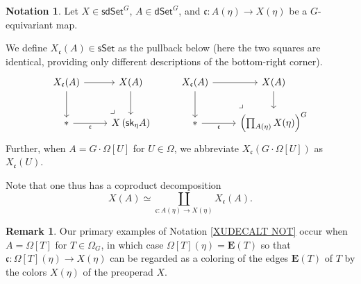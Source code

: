 \documentclass[a4paper,10pt]{article}%
\numberwithin{equation}{section}
\numberwithin{figure}{section}
\theoremstyle{definition} %
\newtheorem{remark}[equation]{Remark}%
\newtheorem{notation}[equation]{Notation}%
\newcommand{\1}{\ensuremath{\mathbbm 1}}%
\begin{document}
\begin{notation}\label{XUDECALT NOT}
	Let $X \in \mathsf{sdSet}^G$, 
	$A \in \mathsf{dSet}^G$,
	and $\mathfrak{c} \colon A(\eta) \to X(\eta)$ 
	be a $G$-equivariant map.
	
	We define $X_{\mathfrak{c}}(A)\in \mathsf{sSet}$
	as the pullback	below
	(here the two squares are identical,
	providing only different descriptions of the bottom-right corner).
\begin{equation}\label{XUDECALT EQ}
\begin{tikzcd}
	X_{\mathfrak{c}}(A) \ar{r} \ar{d}
&
	X(A) \ar{d}
&%
	X_{\mathfrak{c}}(A) \ar{r} \ar{d}
&
	X(A) \ar{d}
\\
	\** \ar{r}[swap]{\mathfrak{c}} 
&
	X \left( \mathsf{sk}_{\eta} A \right)
	\arrow[lu, phantom, "\lrcorner", very near start]
&%
	\** \ar{r}[swap]{\mathfrak{c}} 
&
	\left(\prod_{A(\eta)} X(\eta)\right)^G
	\arrow[lu, phantom, "\lrcorner", very near start]
\end{tikzcd}
\end{equation}
Further, when $A = G \cdot \Omega[U]$
for $U \in \Omega$,
we abbreviate
$X_{\mathfrak{c}}(G \cdot \Omega[U])$
as 
$X_{\mathfrak{c}}(U)$.

Note that one thus has a coproduct decomposition
\begin{equation}
\label{COLDEC_EQ}
X(A) \simeq 
\coprod_{\mathfrak{c} \colon A(\eta) \to X(\eta)}
X_{\mathfrak{c}}(A).
\end{equation}
\end{notation}




\begin{remark}\label{PRIEX REM}
	Our primary examples of Notation \eqref{XUDECALT NOT}
	occur when $A=\Omega[T]$ for $T \in \Omega_G$,
	in which case 
	$\Omega[T](\eta) = \boldsymbol{E}(T)$
	so that
	$\mathfrak{c} \colon 
	\Omega[T](\eta) \to X(\eta)$
	can be regarded as a coloring of the edges 
	$\boldsymbol{E}(T)$
	of $T$ by the colors $X(\eta)$ of the preoperad $X$.
\end{remark}
\end{document}
